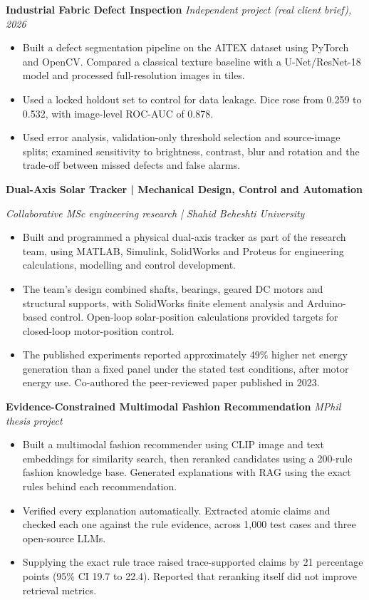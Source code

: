 \documentclass[10pt,a4paper]{article}
\let\cvOriginalTextbf\textbf
\renewcommand{\textbf}[1]{{\fontsize{10.5pt}{14pt}\selectfont\cvOriginalTextbf{#1}}}
\begin{document}
\textbf{Industrial Fabric Defect Inspection} \emph{\textbar{}
Independent project (real client brief), 2026}

\begin{itemize}
\item
  Built a defect segmentation pipeline on the AITEX dataset using
  PyTorch and OpenCV. Compared a classical texture baseline with a
  U-Net/ResNet-18 model and processed full-resolution images in tiles.
\item
  Used a locked holdout set to control for data leakage. Dice rose from
  0.259 to 0.532, with image-level ROC-AUC of 0.878.
\item
  Used error analysis, validation-only threshold selection and source-image
  splits; examined sensitivity to brightness, contrast, blur and rotation
  and the trade-off between missed defects and false alarms.
\end{itemize}

\textbf{Dual-Axis Solar Tracker | Mechanical Design, Control and Automation}

\emph{Collaborative MSc engineering research | Shahid Beheshti University}


\begin{itemize}
\item Built and programmed a physical dual-axis tracker as part of the research team, using MATLAB, Simulink, SolidWorks and Proteus for engineering calculations, modelling and control development.
\item The team's design combined shafts, bearings, geared DC motors and structural supports, with SolidWorks finite element analysis and Arduino-based control. Open-loop solar-position calculations provided targets for closed-loop motor-position control.
\item The published experiments reported approximately 49\% higher net energy generation than a fixed panel under the stated test conditions, after motor energy use. Co-authored the peer-reviewed paper published in 2023.
\end{itemize}


\textbf{Evidence-Constrained Multimodal Fashion Recommendation}
\emph{\textbar{} MPhil thesis project}

\begin{itemize}
\item
  Built a multimodal fashion recommender using CLIP image and text
  embeddings for similarity search, then reranked candidates using a
  200-rule fashion knowledge base. Generated explanations with RAG using
  the exact rules behind each recommendation.
\item
  Verified every explanation automatically. Extracted atomic claims and
  checked each one against the rule evidence, across 1,000 test cases
  and three open-source LLMs.
\item
  Supplying the exact rule trace raised trace-supported claims by 21
  percentage points (95\% CI 19.7 to 22.4). Reported that reranking
  itself did not improve retrieval metrics.
\end{itemize}
\end{document}
